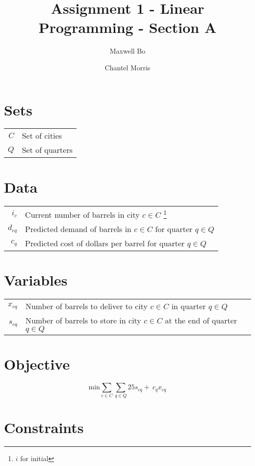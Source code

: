 \documentclass[a4paper]{article}
\title{Assignment 1 - Linear Programming - Section A}
\author{Maxwell Bo  \and Chantel Morris}
\begin{document}
 

\maketitle

\section*{Sets}

\begin{tabular}{rl}
    $C$ & Set of cities\\
    $Q$ & Set of quarters
\end{tabular}

\section*{Data}

\begin{tabular}{rl}
    $i_c$ & Current number of barrels in city $c \in C$ \footnote{$i$ for initial}\\
    $d_{cq}$ & Predicted demand of barrels in $c \in C$ for quarter $q \in Q$\\
    $c_q$ & Predicted cost of dollars per barrel for quarter $q \in Q$\\
\end{tabular}

\section*{Variables}

\begin{tabular}{rl}
    $x_{cq}$ & Number of barrels to deliver to city $c \in C$ in quarter $q \in Q$\\
    $s_{cq}$ & Number of barrels to store in city $c \in C$ at the end of quarter $q \in Q$\\
\end{tabular}

\section*{Objective}

\[
\text{min} \sum_{c \in C}\sum_{q \in Q} 25 s_{cq} +\: c_q x_{cq}
\]

\section*{Constraints}
\end{document}

